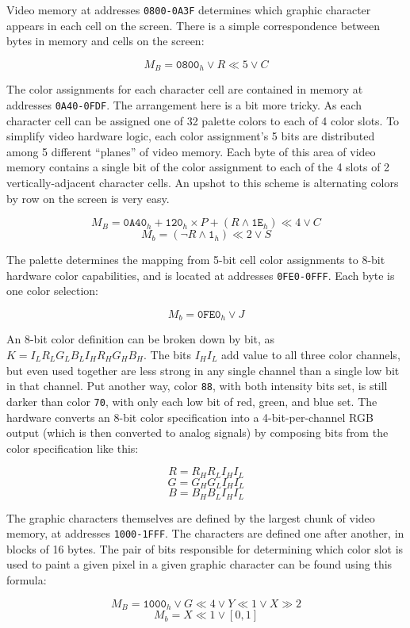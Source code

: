 \documentclass[12pt]{{memoir}}
\begin{document}
Video memory at addresses \texttt{0800-0A3F} determines which graphic character appears in each cell on the screen. There is a simple correspondence between bytes in memory and cells on the screen:

$$M_B = \texttt{0800}_h \vee  R \ll 5 \vee C$$

The color assignments for each character cell are contained in memory at addresses \texttt{0A40-0FDF}. The arrangement here is a bit more tricky. As each character cell can be assigned one of 32 palette colors to each of 4 color slots. To simplify video hardware logic, each color assignment's 5 bits are distributed among 5 different ``planes'' of video memory. Each byte of this area of video memory contains a single bit of the color assignment to each of the 4 slots of 2 vertically-adjacent character cells. An upshot to this scheme is alternating colors by row on the screen is very easy.

$$M_B = \texttt{0A40}_h + \texttt{120}_h \times P + (R \wedge \texttt{1E}_h) \ll 4 \vee C$$
$$M_b = (\lnot{R} \wedge \texttt{1}_h) \ll 2 \vee S$$

The palette determines the mapping from 5-bit cell color assignments to 8-bit hardware color capabilities, and is located at addresses \texttt{0FE0-0FFF}. Each byte is one color selection:

$$M_b = \texttt{0FE0}_h \vee J$$

An 8-bit color definition can be broken down by bit, as $K = I_LR_LG_LB_LI_HR_HG_HB_H$. The bits $I_HI_L$ add value to all three color channels, but even used together are less strong in any single channel than a single low bit in that channel. Put another way, color \texttt{88}, with both intensity bits set, is still darker than color \texttt{70}, with only each low bit of red, green, and blue set. The hardware converts an 8-bit color specification into a 4-bit-per-channel RGB output (which is then converted to analog signals) by composing bits from the color specification like this:

$$R = R_HR_LI_HI_L$$
$$G = G_HG_LI_HI_L$$
$$B = B_HB_LI_HI_L$$

The graphic characters themselves are defined by the largest chunk of video memory, at addresses \texttt{1000-1FFF}. The characters are defined one after another, in blocks of 16 bytes. The pair of bits responsible for determining which color slot is used to paint a given pixel in a given graphic character can be found using this formula:

$$M_B = \texttt{1000}_h \vee G \ll 4 \vee Y \ll 1 \vee X \gg 2$$
$$M_b = X \ll 1 \vee [0,1]$$
\end{document}

